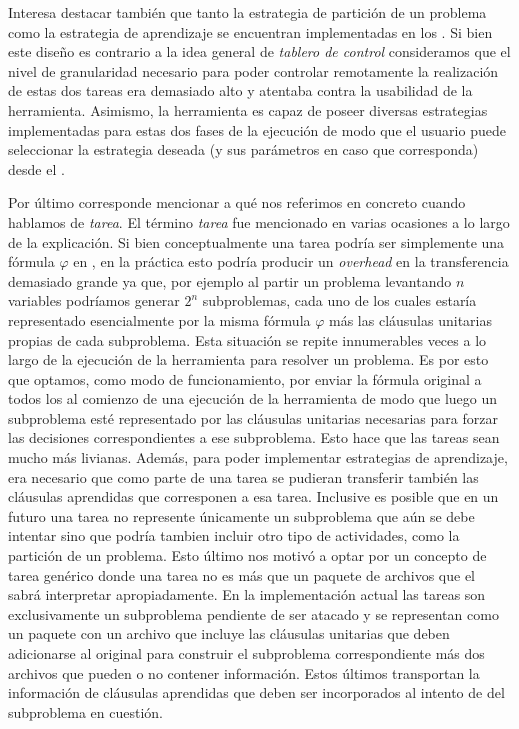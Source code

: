 Interesa destacar también que tanto la estrategia de partición de un problema
como la estrategia de aprendizaje se encuentran implementadas en los \ws. Si
bien este diseño es contrario a la idea general de \emph{tablero de control}
consideramos que el nivel de granularidad necesario para poder controlar
remotamente la realización de estas dos tareas era demasiado alto y atentaba
contra la usabilidad de la herramienta. Asimismo, la herramienta es capaz de
poseer diversas estrategias implementadas para estas dos fases de la ejecución
de modo que el usuario puede seleccionar la estrategia deseada (y sus
parámetros en caso que corresponda) desde el \fend.

Por último corresponde mencionar a qué nos referimos en concreto cuando
hablamos de \emph{tarea}. El término \emph{tarea} fue mencionado en varias
ocasiones a lo largo de la explicación. Si bien conceptualmente una tarea
podría ser simplemente una fórmula $\varphi$ en \cnf, en la práctica esto
podría producir un \emph{overhead} en la transferencia demasiado grande ya
que, por ejemplo al partir un problema levantando $n$ variables podríamos
generar $2^n$ subproblemas, cada uno de los cuales estaría representado
esencialmente por la misma fórmula $\varphi$ más las cláusulas unitarias
propias de cada subproblema. Esta situación se repite innumerables veces a lo
largo de la ejecución de la herramienta para resolver un problema. Es por esto
que optamos, como modo de funcionamiento, por enviar la fórmula original a
todos los \ws al comienzo de una ejecución de la herramienta de modo que luego
un subproblema esté representado por las cláusulas unitarias necesarias para
forzar las decisiones correspondientes a ese subproblema. Esto hace que las
tareas sean mucho más livianas. Además, para poder implementar estrategias de
aprendizaje, era necesario que como parte de una tarea se pudieran transferir
también las cláusulas aprendidas que corresponen a esa tarea. Inclusive es
posible que en un futuro una tarea no represente únicamente un subproblema que
aún se debe intentar \solvear sino que podría tambien incluir otro tipo de
actividades, como la partición de un problema. Esto último nos motivó a optar
por un concepto de tarea genérico donde una tarea no es más que un paquete de
archivos que el \w sabrá interpretar apropiadamente. En la implementación
actual las tareas son exclusivamente un subproblema pendiente de ser atacado y
se representan como un paquete con un archivo que incluye las cláusulas
unitarias que deben adicionarse al \cnf original para construir el subproblema
correspondiente más dos archivos que pueden o no contener información. Estos
últimos transportan la información de cláusulas aprendidas que deben ser
incorporados al intento de \solving del subproblema en cuestión.

